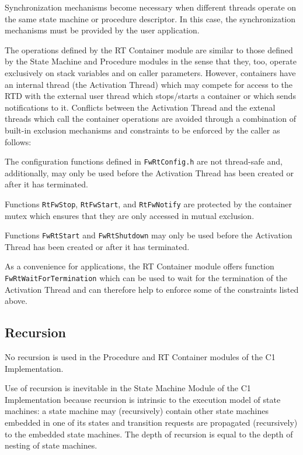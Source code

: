 \documentclass[a4paper,10pt]{article}
\newenvironment{fw_itemize}						%
{\begin{itemize}
  \setlength{\itemsep}{1mm}
  \setlength{\parskip}{0pt}
  \setlength{\parsep}{0pt}}
{\end{itemize}}
\begin{document}
Synchronization mechanisms become necessary when different threads operate on the same state machine or procedure descriptor. In this case, the synchronization mechanisms must be provided by the user application.  

The operations defined by the RT Container module are similar to those defined by the State Machine and Procedure modules in the sense that they, too, operate exclusively on stack variables and on caller parameters. However, containers have an internal thread (the Activation Thread) which may compete for access to the RTD with the external user thread which stops/starts a container or which sends notifications to it. Conflicts between the Activation Thread and the extenal threads which call the container operations are avoided through a combination of built-in exclusion mechanisms and constraints to be enforced by the caller as follows:

\begin{fw_itemize}
\item The configuration functions defined in \texttt{FwRtConfig.h} are not thread-safe and, additionally, may only be used before the Activation Thread has been created or after it has terminated. 
\item Functions \texttt{RtFwStop}, \texttt{RtFwStart}, and \texttt{RtFwNotify} are protected by the container mutex which ensures that they are only accessed in mutual exclusion.
\item Functions \texttt{FwRtStart} and \texttt{FwRtShutdown} may only be used before the Activation Thread has been created or after it has terminated.  
\end{fw_itemize}

As a convenience for applications, the RT Container module offers function \texttt{FwRtWaitForTermination} which can be used to wait for the termination of the Activation Thread and can therefore help to enforce some of the constraints listed above. 

\subsection{Recursion}
No recursion is used in the Procedure and RT Container modules of the C1 Implementation.

Use of recursion is inevitable in the State Machine Module of the C1 Implementation because recursion 
is intrinsic to the execution model of state machines: a state machine may 
(recursively) contain other state machines embedded in one of its states and transition requests 
are propagated (recursively) to the embedded state machines. 
The depth of recursion is equal to the depth of nesting of state machines.
\end{document}
